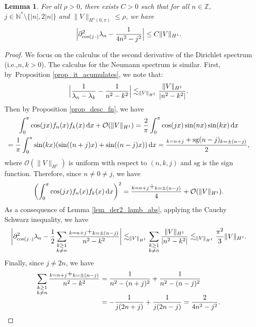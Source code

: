 \documentclass[11pt]{article}
\makeatletter
\newcommand{\ie}{i.e.,\xspace}
\DeclareRobustCommand{\mathbbm}[1]{\csname jepbb@#1\endcsname}
\newtheorem{lemma}[theorem]{Lemma}
\theoremstyle{definition}
\makeatother
\begin{document}
\begin{lemma}
\label{lem_est_d2} For all $\rho >0$, there exists $C>0$ such that for all $n\in \mathbb{Z}$, $j\in \mathbb{N}^* \setminus \{ |n|,2|n|\}$ and $\|V\|_{H^1(0,\pi)} \leq \rho$, we have
\[
\Bigl| \partial^2_{\cos(j \,\cdot)}\lambda_n - \frac1{4n^2 -j^2} \Bigr| \leq C \|V\|_{H^1}.
\]

\end{lemma}
\begin{proof} We focus on the calculus of the second derivative of the Dirichlet spectrum (\ie $n,k>0$). The calculus for the Neumann spectrum is similar. First, by~Proposition \ref{prop_it_acumulates}, we note that:
\[
\Bigl| \frac1{\lambda_n - \lambda_k} - \frac1{n^2 - k^2} \Bigr| \lesssim_{\|V\|_{H^1}} \frac{\|V\|_{H^1}}{|n^2-k^2|}.
\]
Then by Proposition \ref{prop_desc_fn}, we have
\begin{multline*}
\int_0^\pi \cos(j x) f_n(x) f_k(x) \, \mathrm{d}x + \mathcal{O}(\| V\|_{H^1}) = \frac2\pi \int_0^\pi \cos(j x) \sin(n x) \sin(k x) \, \mathrm{d}x \\
= \frac1\pi \int_0^\pi \sin(kx) (\sin((n+j)x)+\sin((n-j)x)) \, \mathrm{d}x = \frac{\mathbbm{1}_{k=n+j} + \mathrm{sg}(n-j) \mathbbm{1}_{k=\pm (n-j)} }2,
\end{multline*}
where $\mathcal{O}(\| V\|_{H^1})$ is uniform with respect to $(n,k,j)$ and $\mathrm{sg}$ is the sign function. Therefore, since $n\neq 0\neq j$, we have
\[
\left(\int_0^\pi \cos(j x) f_n(x) f_k(x) \, \mathrm{d}x \right)^2 = \frac{\mathbbm{1}_{k=n+j} + \mathbbm{1}_{k=\pm (n-j)} }4 + \mathcal{O}(\| V\|_{H^1}).
\]
As a consequence of Lemma \ref{lem_der2_lamb_abs}, applying the Cauchy Schwarz inequality, we have
\[
\biggl| \partial^2_{\cos(j \,\cdot)}\lambda_n - \frac12\sum_{\substack{k \geq 1\\ k\neq n}} \frac{\mathbbm{1}_{k=n+j} + \mathbbm{1}_{k=\pm (n-j)}}{ n^2-k^2} \biggr|\lesssim_{\|V\|_{H^1}} \sum_{\substack{k \geq 1\\ k\neq n}} \frac{\|V\|_{H^1}}{|n^2-k^2|} \lesssim_{\|V\|_{H^1}} \frac{\pi^2}3 \|V\|_{H^1}.
\]
Finally, since $j\neq 2n$, we have
\begin{align*}
\sum_{\substack{k \geq 1\\ k\neq n}} \frac{\mathbbm{1}_{k=n+j} + \mathbbm{1}_{k=\pm (n-j)}}{ n^2-k^2} &= \frac{1}{n^2 - (n+j)^2} + \frac{1}{n^2 - (n-j)^2}\\[-5pt]
&= -\frac1{j(2n+j)} + \frac1{j(2n-j)} = \frac2{4n^2-j^2}.\qedhere
\end{align*}
\end{proof}
\end{document}
